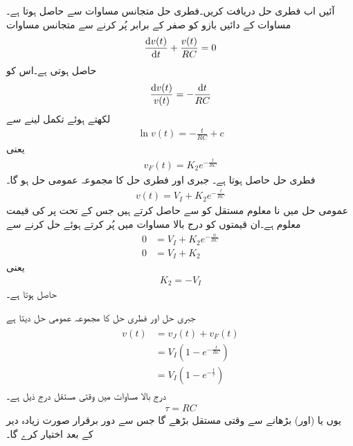 آئیں اب فطری حل دریافت کریں۔فطری حل متجانس مساوات سے حاصل ہوتا ہے۔مساوات  کے دائیں بازو کو صفر کے برابر پُر کرنے سے متجانس مساوات
\begin{align}\label{مساوات_عارضی_برق_گیر_ہم_جنسی_الف}
\frac{\dif v(t)}{\dif t}+\frac{v(t)}{RC}=0
\end{align}
 حاصل ہوتی ہے۔اس کو
\begin{align*}
\frac{\dif v(t)}{v(t)}=-\frac{\dif t}{RC}
\end{align*}
لکھتے ہوئے تکمل لینے سے
\begin{align*}
\ln v(t)=-\frac{t}{RC}+c
\end{align*}
یعنی
\begin{align*}
v_F(t)=K_2 e^{-\frac{t}{RC}}
\end{align*}
فطری حل حاصل ہوتا ہے۔ جبری اور فطری حل کا مجموعہ عمومی حل ہو گا۔
\begin{align*}
v(t)=V_I+K_2 e^{-\frac{t}{RC}}
\end{align*}
عمومی حل میں نا معلوم مستقل کو  سے حاصل کرتے ہیں جس کے تحت  پر  کی قیمت معلوم ہے۔ان قیمتوں کو درج بالا مساوات میں پُر کرتے ہوئے حل کرنے سے
\begin{align*}
0&=V_I+K_2 e^{-\frac{0}{RC}}\\
0&=V_I+K_2
\end{align*}
یعنی
\begin{align*}
K_2=-V_I
\end{align*}
حاصل ہوتا ہے۔ 

جبری حل اور فطری حل کا مجموعہ عمومی حل دیتا ہے
\begin{gather}
\begin{aligned}\label{مساوات_عارضی_مزاحمت_برق_گیر_کا_دباو}
v(t)&=v_J(t)+v_F(t)\\
&=V_I\left(1-e^{-\frac{t}{RC}}\right)\\
&=V_I\left(1-e^{-\frac{t}{\tau}}\right)
\end{aligned}
\end{gather}
درج بالا مساوات میں وقتی مستقل درج ذیل ہے۔
\begin{align}
\tau=RC
\end{align}
یوں  یا (اور)  بڑھانے سے  وقتی مستقل بڑھے گا جس سے دور برقرار صورت زیادہ دیر کے بعد اختیار کرے گا۔ 

